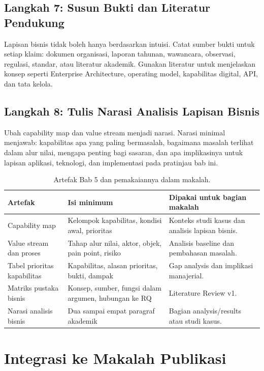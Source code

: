 \subsection{Langkah 7: Susun Bukti dan Literatur Pendukung}

Lapisan bisnis tidak boleh hanya berdasarkan intuisi. Catat sumber bukti untuk
setiap klaim: dokumen organisasi, laporan tahunan, wawancara, observasi,
regulasi, standar, atau literatur akademik. Gunakan literatur untuk menjelaskan
konsep seperti Enterprise Architecture, operating model, kapabilitas digital,
API, dan tata kelola.

\subsection{Langkah 8: Tulis Narasi Analisis Lapisan Bisnis}

Ubah capability map dan value stream menjadi narasi. Narasi minimal menjawab:
kapabilitas apa yang paling bermasalah, bagaimana masalah terlihat dalam alur
nilai, mengapa penting bagi sasaran, dan apa implikasinya untuk lapisan
aplikasi, teknologi, dan implementasi pada pratinjau bab ini.

\begin{table}[htbp]
\centering
\scriptsize
\caption{Artefak Bab 5 dan pemakaiannya dalam makalah.}
\label{tab:artefak-bab4}
\begin{tabularx}{\textwidth}{@{}p{} p{} X@{}}
\hline
\textbf{Artefak} & \textbf{Isi minimum} & \textbf{Dipakai untuk bagian makalah} \\
\hline
Capability map & Kelompok kapabilitas, kondisi awal, prioritas & Konteks studi
kasus dan analisis lapisan bisnis. \\
Value stream dan proses & Tahap alur nilai, aktor, objek, pain point, risiko &
Analisis baseline dan pembahasan masalah. \\
Tabel prioritas kapabilitas & Kapabilitas, alasan prioritas, bukti, dampak &
Gap analysis dan implikasi manajerial. \\
Matriks pustaka bisnis & Konsep, sumber, fungsi dalam argumen, hubungan ke RQ &
Literature Review v1. \\
Narasi analisis bisnis & Dua sampai empat paragraf akademik & Bagian
analysis/results atau studi kasus. \\
\hline
\end{tabularx}
\end{table}

\section{Integrasi ke Makalah Publikasi}

